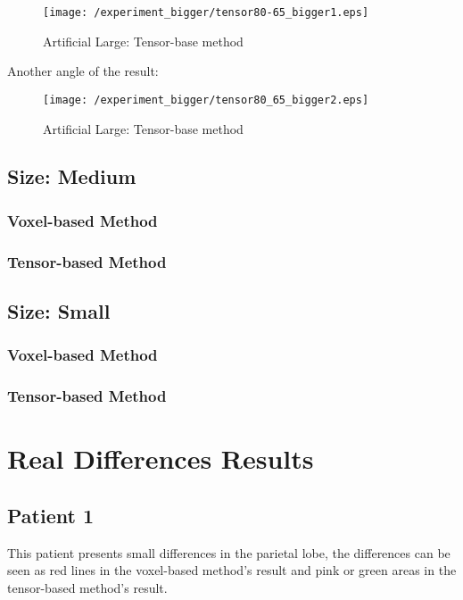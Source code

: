 \begin{figure}[H]
  \centering
  \texttt{[image: /experiment\_bigger/tensor80-65\_bigger1.eps]}
  \caption{Artificial Large: Tensor-base method}
  \label{voxel_large1}
\end{figure}

Another angle of the result:

\begin{figure}[H]
  \centering
  \texttt{[image: /experiment\_bigger/tensor80\_65\_bigger2.eps]}
  \caption{Artificial Large: Tensor-base method}
  \label{voxel_large2}
\end{figure}


\subsection{Size: Medium}
\subsubsection{Voxel-based Method}

\subsubsection{Tensor-based Method}


\subsection{Size: Small}
\subsubsection{Voxel-based Method}




\subsubsection{Tensor-based Method}


\section{Real Differences Results}

\subsection{Patient 1}
This patient presents small differences in the parietal lobe, the
differences can be seen as red lines in the voxel-based method's result
and pink or green areas in the tensor-based method's result.

